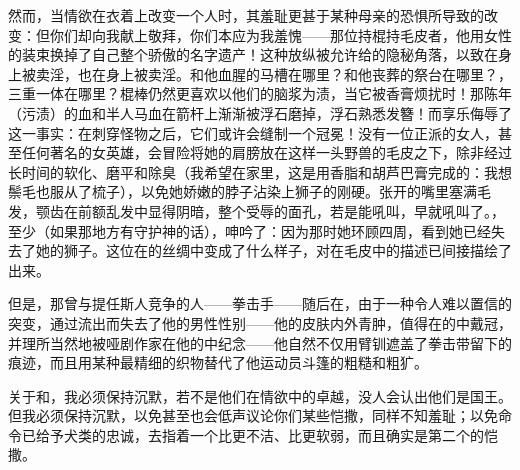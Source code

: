 然而，当情欲在衣着上改变一个人时，其羞耻更甚于某种母亲的恐惧所导致的改变：但你们却向我献上敬拜，你们本应为我羞愧——那位持棍持毛皮者，他用女性的装束换掉了自己整个骄傲的名字遗产！这种放纵被允许给的隐秘角落，以致在身上被卖淫，也在身上被卖淫。和他血腥的马槽在哪里？和他丧葬的祭台在哪里？，三重一体在哪里？棍棒仍然更喜欢以他们的脑浆为渍，当它被香膏烦扰时！那陈年（污渍）的血和半人马血在箭杆上渐渐被浮石磨掉，浮石熟悉发簪！而享乐侮辱了这一事实：在刺穿怪物之后，它们或许会缝制一个冠冕！没有一位正派的女人，甚至任何著名的女英雄，会冒险将她的肩膀放在这样一头野兽的毛皮之下，除非经过长时间的软化、磨平和除臭（我希望在家里，这是用香脂和胡芦巴膏完成的：我想鬃毛也服从了梳子），以免她娇嫩的脖子沾染上狮子的刚硬。张开的嘴里塞满毛发，颚齿在前额乱发中显得阴暗，整个受辱的面孔，若是能吼叫，早就吼叫了。，至少（如果那地方有守护神的话），呻吟了：因为那时她环顾四周，看到她已经失去了她的狮子。这位在的丝绸中变成了什么样子，对在毛皮中的描述已间接描绘了出来。\par

但是，那曾与提任斯人竞争的人——拳击手——随后在，由于一种令人难以置信的突变，通过流出而失去了他的男性性别——他的皮肤内外青肿，值得在的中戴冠，并理所当然地被哑剧作家在他的中纪念——他自然不仅用臂钏遮盖了拳击带留下的痕迹，而且用某种最精细的织物替代了他运动员斗篷的粗糙和粗犷。\par

关于和，我必须保持沉默，若不是他们在情欲中的卓越，没人会认出他们是国王。但我必须保持沉默，以免甚至也会低声议论你们某些恺撒，同样不知羞耻；以免命令已给予犬类的忠诚，去指着一个比更不洁、比更软弱，而且确实是第二个的恺撒。\par

